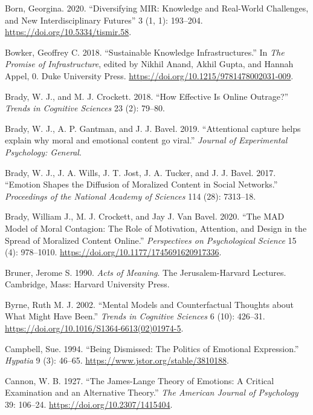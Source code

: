 \documentclass[12pt]{book}
\newenvironment{CSLReferences}%
  {\setlength{\parindent}{0pt}%
   \setlength{\leftskip}{0pt}%
   \setlength{\parskip}{0pt}}%
  {\par}
\theoremstyle{definition}
\theoremstyle{remark}
\begin{document}
\begin{CSLReferences}{1}{0}
Born, Georgina. 2020. {``Diversifying {MIR}: {Knowledge} and {Real-World Challenges}, and {New Interdisciplinary Futures}''} 3 (1, 1): 193--204. \url{https://doi.org/10.5334/tismir.58}.

Bowker, Geoffrey C. 2018. {``Sustainable {Knowledge Infrastructures}.''} In \emph{The {Promise} of {Infrastructure}}, edited by Nikhil Anand, Akhil Gupta, and Hannah Appel, 0. Duke University Press. \url{https://doi.org/10.1215/9781478002031-009}.

Brady, W. J., and M. J. Crockett. 2018. {``How Effective Is Online Outrage?''} \emph{Trends in Cognitive Sciences} 23 (2): 79--80.

Brady, W. J., A. P. Gantman, and J. J. Bavel. 2019. {``Attentional capture helps explain why moral and emotional content go viral.''} \emph{Journal of Experimental Psychology: General}.

Brady, W. J., J. A. Wills, J. T. Jost, J. A. Tucker, and J. J. Bavel. 2017. {``Emotion Shapes the Diffusion of Moralized Content in Social Networks.''} \emph{Proceedings of the National Academy of Sciences} 114 (28): 7313--18.

Brady, William J., M. J. Crockett, and Jay J. Van Bavel. 2020. {``The {MAD} Model of Moral Contagion: The Role of Motivation, Attention, and Design in the Spread of Moralized Content Online.''} \emph{Perspectives on Psychological Science} 15 (4): 978--1010. \url{https://doi.org/10.1177/1745691620917336}.

Bruner, Jerome S. 1990. \emph{Acts of Meaning}. The {Jerusalem-Harvard} Lectures. Cambridge, Mass: Harvard University Press.

Byrne, Ruth M. J. 2002. {``Mental Models and Counterfactual Thoughts about What Might Have Been.''} \emph{Trends in Cognitive Sciences} 6 (10): 426--31. \url{https://doi.org/10.1016/S1364-6613(02)01974-5}.

Campbell, Sue. 1994. {``Being {Dismissed}: {The Politics} of {Emotional Expression}.''} \emph{Hypatia} 9 (3): 46--65. \url{https://www.jstor.org/stable/3810188}.

Cannon, W. B. 1927. {``The {James-Lange} Theory of Emotions: A Critical Examination and an Alternative Theory.''} \emph{The American Journal of Psychology} 39: 106--24. \url{https://doi.org/10.2307/1415404}.


\end{CSLReferences}
\end{document}
